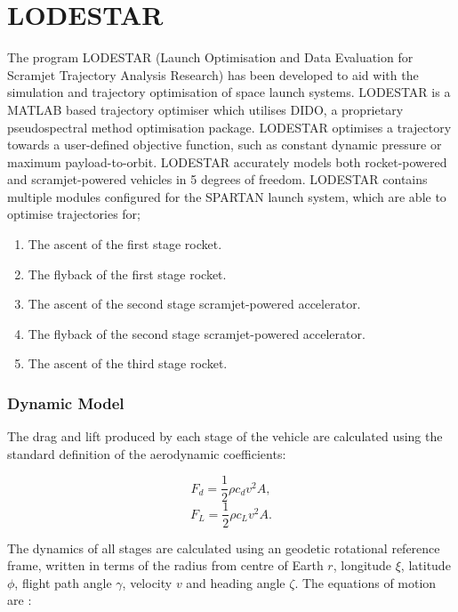 
\cleardoublepage
\chapter{LODESTAR}\label{chapter:experimental-results}

	

The program LODESTAR (Launch Optimisation and Data Evaluation for Scramjet Trajectory Analysis Research) has been developed to aid with the simulation and trajectory optimisation of space launch systems. LODESTAR is a MATLAB based trajectory optimiser which utilises DIDO, a proprietary pseudospectral method optimisation package. LODESTAR optimises a trajectory towards a user-defined objective function, such as constant dynamic pressure or maximum payload-to-orbit.  LODESTAR accurately models both rocket-powered and scramjet-powered vehicles in 5 degrees of freedom. LODESTAR contains multiple modules configured for the SPARTAN launch system, which are able to optimise trajectories for;
\begin{enumerate}
 \item The ascent of the first stage rocket.
 \item The flyback of the first stage rocket.
 \item The ascent of the second stage scramjet-powered accelerator.
 \item The flyback of the second stage scramjet-powered accelerator.
 \item The ascent of the third stage rocket.
\end{enumerate}



\subsection{Dynamic Model}
The drag and lift produced by each stage of the vehicle are calculated using the standard definition of the aerodynamic coefficients:

\begin{equation}
F_d = \frac{1}{2}\rho c_d v^2 A ,
\end{equation}
\begin{equation}
F_L = \frac{1}{2}\rho c_L v^2 A .
\end{equation}

The dynamics of all stages are calculated using an geodetic rotational reference frame, written in terms of the radius from centre of Earth $r$, longitude $\xi$, latitude $\phi$, flight path angle $\gamma$, velocity $v$ and heading angle $\zeta$. The equations of motion are \cite{Josselyn2002a}:


